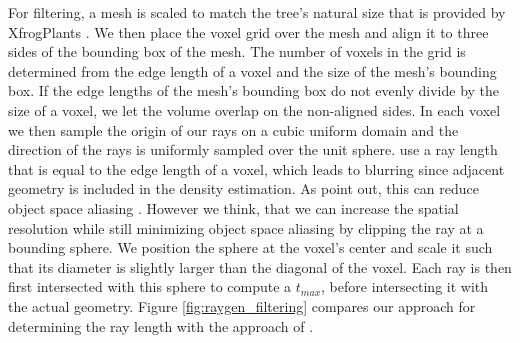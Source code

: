For filtering, a mesh is scaled to match the tree's natural size that is provided by XfrogPlants \cite{xfrogplants}.
We then place the voxel grid over the mesh and align it to three sides of the bounding box of the mesh.
The number of voxels in the grid is determined from the edge length of a voxel and the size of the mesh's bounding box.
If the edge lengths of the mesh's bounding box do not evenly divide by the size of a voxel, we let the volume overlap on the non-aligned sides.
In each voxel we then sample the origin of our rays on a cubic uniform domain and the direction of the rays is uniformly sampled over the unit sphere.
\citeauthor{hybrid_mesh_volume_lods} use a ray length that is equal to the edge length of a voxel, which leads to blurring since adjacent geometry is included in the density estimation.
As \citeauthor{wang_object_space_aliasing} point out, this can reduce object space aliasing \cite{wang_object_space_aliasing}.
However we think, that we can increase the spatial resolution while still minimizing object space aliasing by clipping the ray at a bounding sphere.
We position the sphere at the voxel's center and scale it such that its diameter is slightly larger than the diagonal of the voxel.
Each ray is then first intersected with this sphere to compute a $t_{max}$, before intersecting it with the actual geometry.
Figure \ref{fig:raygen_filtering} compares our approach for determining the ray length with the approach of \citeauthor{hybrid_mesh_volume_lods} \cite{hybrid_mesh_volume_lods}.
